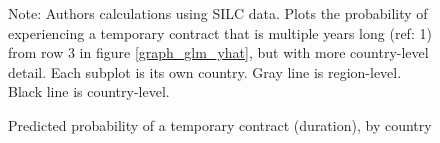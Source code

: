 \begin{figure}[htp!]
    \caption{Predicted probability of a temporary contract (duration), by country}
    \label{graph_eu_silc_glm_yhat_dur_country}
    \footnotesize{Note: Authors calculations using SILC data.  Plots the probability of experiencing a temporary contract that is multiple years long (ref: 1) from row 3 in figure \ref{graph_glm_yhat}, but with more country-level detail.  Each subplot is its own country.  Gray line is region-level.  Black line is country-level.}
\end{figure}

